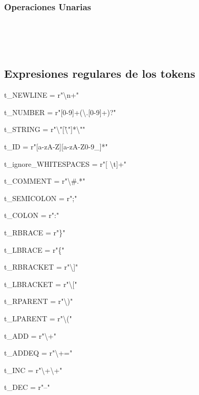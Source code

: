 \subsubsection{Operaciones Unarias}
  \begin{reglas}
    \\
    \\
    \aregla{\RES}
    \\
  \end{reglas}


\subsection{Expresiones regulares de los tokens}

t\_NEWLINE = r"\textbackslash n+"

t\_NUMBER = r"[0-9]+(\textbackslash.[0-9]+)?" 

t\_STRING = r"\textbackslash"[\^ \textbackslash"]*\textbackslash""

t\_ID = r"[a-zA-Z][a-zA-Z0-9\_]*"

t\_ignore\_WHITESPACES = r"[ \textbackslash t]+"

t\_COMMENT = r"\textbackslash\#.*"

t\_SEMICOLON = r";"

t\_COLON = r":"
 
t\_RBRACE = r"\}"
 
t\_LBRACE = r"\{"

t\_RBRACKET = r"\textbackslash]"
      
t\_LBRACKET = r"\textbackslash["
           
t\_RPARENT = r"\textbackslash)"
             
t\_LPARENT = r"\textbackslash("
              
t\_ADD = r"\textbackslash+"
                
t\_ADDEQ = r"\textbackslash+="
                   
t\_INC = r"\textbackslash+\textbackslash+"
                    
t\_DEC = r"--"
                     
